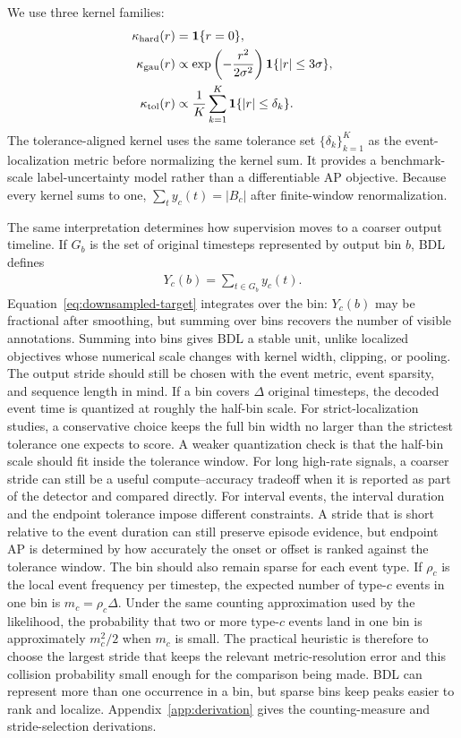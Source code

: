 We use three kernel families:
\begin{align}
    \kappa_{\mathrm{hard}}(r) &= \mathbf{1}\{r=0\}, \\
    \kappa_{\mathrm{gau}}(r) &\propto
        \exp\left(-\frac{r^2}{2\sigma^2}\right)\mathbf{1}\{|r|\le 3\sigma\}, \\
    \kappa_{\mathrm{tol}}(r) &\propto
        \frac{1}{K}\sum_{k=1}^{K}\mathbf{1}\{|r|\le \delta_k\}.
\end{align}
The tolerance-aligned kernel uses the same tolerance set $\{\delta_k\}_{k=1}^{K}$ as the event-localization metric before normalizing the kernel sum.
It provides a benchmark-scale label-uncertainty model rather than a differentiable AP objective.
Because every kernel sums to one, $\sum_t y_c(t)=|B_c|$ after finite-window renormalization.

The same interpretation determines how supervision moves to a coarser output timeline.
If $G_b$ is the set of original timesteps represented by output bin $b$, BDL defines
\begin{align}
    Y_c(b) = \sum_{t\in G_b} y_c(t).
    \label{eq:downsampled-target}
\end{align}
Equation~\ref{eq:downsampled-target} integrates over the bin: $Y_c(b)$ may be fractional after smoothing, but summing over bins recovers the number of visible annotations.
Summing into bins gives BDL a stable unit, unlike localized objectives whose numerical scale changes with kernel width, clipping, or pooling.
The output stride should still be chosen with the event metric, event sparsity, and sequence length in mind.
If a bin covers $\Delta$ original timesteps, the decoded event time is quantized at roughly the half-bin scale.
For strict-localization studies, a conservative choice keeps the full bin width no larger than the strictest tolerance one expects to score.
A weaker quantization check is that the half-bin scale should fit inside the tolerance window.
For long high-rate signals, a coarser stride can still be a useful compute--accuracy tradeoff when it is reported as part of the detector and compared directly.
For interval events, the interval duration and the endpoint tolerance impose different constraints.
A stride that is short relative to the event duration can still preserve episode evidence, but endpoint AP is determined by how accurately the onset or offset is ranked against the tolerance window.
The bin should also remain sparse for each event type.
If $\rho_c$ is the local event frequency per timestep, the expected number of type-$c$ events in one bin is $m_c=\rho_c\Delta$.
Under the same counting approximation used by the likelihood, the probability that two or more type-$c$ events land in one bin is approximately $m_c^2/2$ when $m_c$ is small.
The practical heuristic is therefore to choose the largest stride that keeps the relevant metric-resolution error and this collision probability small enough for the comparison being made.
BDL can represent more than one occurrence in a bin, but sparse bins keep peaks easier to rank and localize.
Appendix~\ref{app:derivation} gives the counting-measure and stride-selection derivations.

